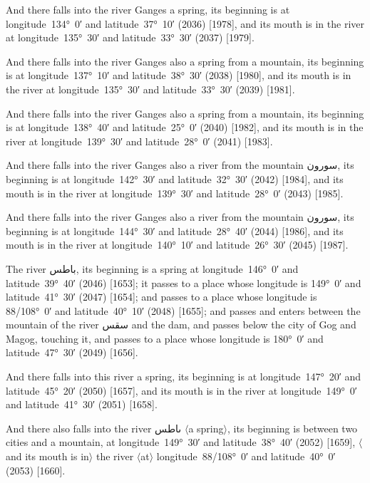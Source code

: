 \documentclass[11pt]{article}
\newcommand{\Pg}[1]{\marginpar{\footnotesize #1}}
\newcommand{\Ang}[1]{\ensuremath{#1}}
\begin{document}
And there falls into the river Ganges a spring, its beginning is at longitude~134°~0′ and latitude~37°~10′ (2036) [1978], and its mouth is in the river at longitude~135°~30′ and latitude~33°~30′ (2037) [1979].

And there falls into the river Ganges also a spring from a mountain, its beginning is at longitude~137°~10′ and latitude~38°~30′ (2038) [1980], and its mouth is in the river at longitude~135°~30′ and latitude~33°~30′ (2039) [1981].

And there falls into the river Ganges also a spring from a mountain, its beginning is at longitude~138°~40′ and latitude~25°~0′ (2040) [1982], and its mouth is in the river at longitude~139°~30′ and latitude~28°~0′ (2041) [1983].

And there falls into the river Ganges also a river from the mountain \textarabic{سورون}, its beginning is at longitude~142°~30′ and latitude~32°~30′ (2042) [1984], and its mouth is in the river at longitude~139°~30′ and latitude~28°~0′ (2043) [1985]\Pg{p. 135}.

And there falls into the river Ganges also a river from the mountain \textarabic{سورون}, its beginning is at longitude~144°~30′ and latitude~28°~40′ (2044) [1986], and its mouth is in the river at longitude~140°~10′ and latitude~26°~30′ (2045) [1987].

The river \textarabic{باطس}, its beginning is a spring at longitude~146°~0′ and latitude~39°~40′ (2046) [1653]; it passes to a place whose longitude is 149°~0′ and latitude~41°~30′ (2047) [1654]; and passes to a place whose longitude is 88/108°~0′ and latitude~40°~10′ (2048) [1655]; and passes and enters between the mountain of the river \textarabic{سقس} and the dam, and passes below the city of Gog and Magog, touching it, and passes to a place whose longitude is 180°~0′ and latitude~47°~30′ (2049) [1656].

And there falls into this river a spring, its beginning is at longitude~147°~20′ and latitude~45°~20′ (2050) [1657], and its mouth is in the river at longitude~149°~0′ and latitude~41°~30′ (2051) [1658].

And there also falls into the river \textarabic{ٮاطس} \Ang{\langle}a spring\Ang{\rangle}, its beginning is between two cities and a mountain, at longitude~149°~30′ and latitude~38°~40′ (2052) [1659], \Ang{\langle}and its mouth is in\Ang{\rangle} the river \Ang{\langle}at\Ang{\rangle} longitude~88/108°~0′ and latitude~40°~0′ (2053) [1660].
\end{document}
